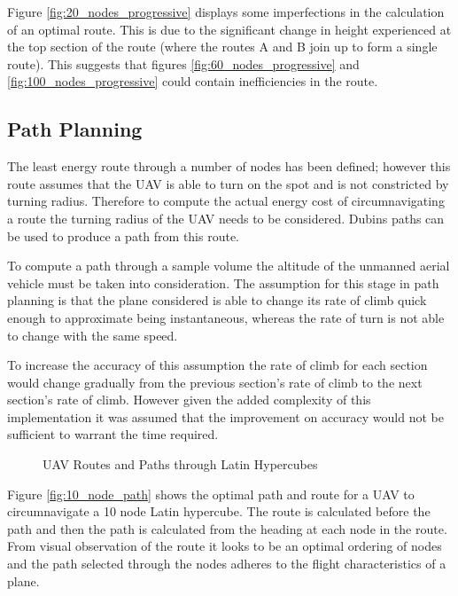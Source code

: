 \documentclass[a4paper,12pt,twoside]{article}
\begin{document}
Figure \ref{fig:20_nodes_progressive} displays some imperfections in the calculation of an optimal route. This is due to the significant change in height experienced at the top section of the route (where the routes A and B join up to form a single route). This suggests that figures \ref{fig:60_nodes_progressive} and \ref{fig:100_nodes_progressive} could contain inefficiencies in the route.

\subsection{Path Planning}
\label{sec:path_planning}

The least energy route through a number of nodes has been defined; however this route assumes that the UAV is able to turn on the spot and is not constricted by turning radius. Therefore to compute the actual energy cost of circumnavigating a route the turning radius of the UAV needs to be considered. Dubins paths can be used to produce a path from this route.

To compute a path through a sample volume the altitude of the unmanned aerial vehicle must be taken into consideration. The assumption for this stage in path planning is that the plane considered is able to change its rate of climb quick enough to approximate being instantaneous, whereas the rate of turn is not able to change with the same speed.

To increase the accuracy of this assumption the rate of climb for each section would change gradually from the previous section's rate of climb to the next section's rate of climb. However given the added complexity of this implementation it was assumed that the improvement on accuracy would not be sufficient to warrant the time required.

\begin{figure}
	\centering
	
	\caption{UAV Routes and Paths through Latin Hypercubes}
	\label{fig:uav_routes_and_paths_through_latin_hypercubes}
\end{figure}

Figure \ref{fig:10_node_path} shows the optimal path and route for a UAV to circumnavigate a 10 node Latin hypercube. The route is calculated before the path and then the path is calculated from the heading at each node in the route. From visual observation of the route it looks to be an optimal ordering of nodes and the path selected through the nodes adheres to the flight characteristics of a plane.
\end{document}
